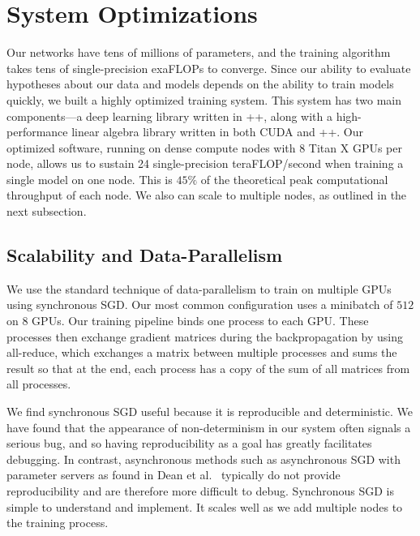 \section{System Optimizations}

Our networks have tens of millions of parameters, and the training algorithm
takes tens of single-precision exaFLOPs to converge. Since our ability to
evaluate hypotheses about our data and models depends on the ability to train
models quickly, we built a highly optimized training system. This system has
two main components---a deep learning library written in \C++, along with a
high-performance linear algebra library written in both CUDA and \C++. Our
optimized software, running on dense compute nodes with 8 Titan X GPUs per
node, allows us to sustain 24 single-precision teraFLOP/second when training a
single model on one node. This is $45\%$ of the theoretical peak computational
throughput of each node. We also can scale to multiple nodes, as outlined in
the next subsection.

\subsection{Scalability and Data-Parallelism}

We use the standard technique of data-parallelism to train on multiple GPUs
using synchronous SGD. Our most common configuration uses a minibatch of $512$
on $8$ GPUs. Our training pipeline binds one process to each GPU. These
processes then exchange gradient matrices during the backpropagation by using
all-reduce, which exchanges a matrix between multiple processes and sums the
result so that at the end, each process has a copy of the sum of all matrices
from all processes. 

We find synchronous SGD useful because it is reproducible and deterministic. We
have found that the appearance of non-determinism in our system often signals a
serious bug, and so having reproducibility as a goal has greatly facilitates
debugging. In contrast, asynchronous methods such as asynchronous SGD with
parameter servers as found in Dean et al.~\cite{dean2012} typically do not
provide reproducibility and are therefore more difficult to debug. Synchronous
SGD is simple to understand and implement. It scales well as we add multiple
nodes to the training process.

